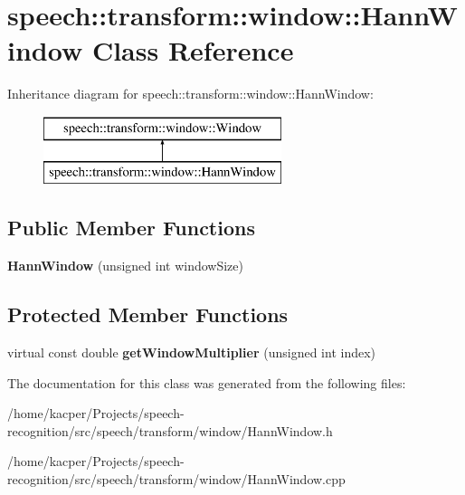 \hypertarget{classspeech_1_1transform_1_1window_1_1HannWindow}{\section{speech\+:\+:transform\+:\+:window\+:\+:Hann\+Window Class Reference}
\label{classspeech_1_1transform_1_1window_1_1HannWindow}
}
Inheritance diagram for speech\+:\+:transform\+:\+:window\+:\+:Hann\+Window\+:\begin{figure}[H]
\begin{center}
\leavevmode
\includegraphics[height=2.000000cm]{classspeech_1_1transform_1_1window_1_1HannWindow}
\end{center}
\end{figure}
\subsection*{Public Member Functions}
\begin{DoxyCompactItemize}
\item 
\hypertarget{classspeech_1_1transform_1_1window_1_1HannWindow_af36a703d5b57bb3d5d01de187aabedc7}{{\bfseries Hann\+Window} (unsigned int window\+Size)}\label{classspeech_1_1transform_1_1window_1_1HannWindow_af36a703d5b57bb3d5d01de187aabedc7}

\end{DoxyCompactItemize}
\subsection*{Protected Member Functions}
\begin{DoxyCompactItemize}
\item 
\hypertarget{classspeech_1_1transform_1_1window_1_1HannWindow_add76ee5637f9c0ae3e830e409c013151}{virtual const double {\bfseries get\+Window\+Multiplier} (unsigned int index)}\label{classspeech_1_1transform_1_1window_1_1HannWindow_add76ee5637f9c0ae3e830e409c013151}

\end{DoxyCompactItemize}


The documentation for this class was generated from the following files\+:\begin{DoxyCompactItemize}
\item 
/home/kacper/\+Projects/speech-\/recognition/src/speech/transform/window/Hann\+Window.\+h\item 
/home/kacper/\+Projects/speech-\/recognition/src/speech/transform/window/Hann\+Window.\+cpp\end{DoxyCompactItemize}
